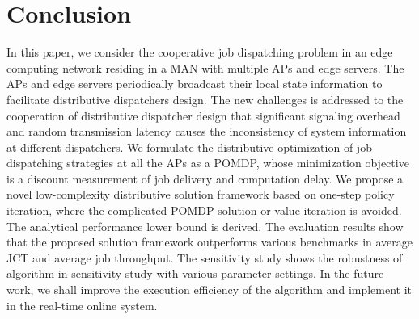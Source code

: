 \section{Conclusion}
\label{sec:conclusion}
In this paper, we consider the cooperative job dispatching problem in an edge computing network residing in a MAN with multiple APs and edge servers.
The APs and edge servers periodically broadcast their local state information to facilitate distributive dispatchers design.
The new challenges is addressed to the cooperation of distributive dispatcher design that significant signaling overhead and random transmission latency causes the inconsistency of system information at different dispatchers.
We formulate the distributive optimization of job dispatching strategies at all the APs as a POMDP, whose minimization objective is a discount measurement of job delivery and computation delay.
We propose a novel low-complexity distributive solution framework based on one-step policy iteration, where the complicated POMDP solution or value iteration is avoided.
The analytical performance lower bound is derived.
The evaluation results show that the proposed solution framework outperforms various benchmarks in average JCT and average job throughput.
The sensitivity study shows the robustness of algorithm in sensitivity study with various parameter settings.
In the future work, we shall improve the execution efficiency of the algorithm and implement it in the real-time online system. 